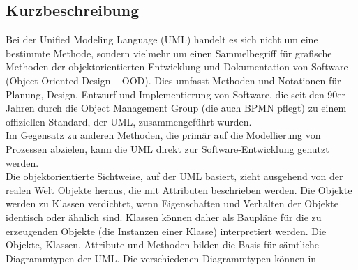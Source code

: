 \subsection{Kurzbeschreibung}
Bei der Unified Modeling Language (UML) handelt es sich nicht um eine bestimmte Methode, sondern vielmehr um einen Sammelbegriff für grafische Methoden der objektorientierten Entwicklung und Dokumentation von Software (Object Oriented Design – OOD). Dies umfasst Methoden und Notationen für Planung, Design, Entwurf und Implementierung von Software, die seit den 90er Jahren durch die Object Management Group (die auch BPMN pflegt) zu einem offiziellen Standard, der UML, zusammengeführt wurden.\\
Im Gegensatz zu anderen Methoden, die primär auf die Modellierung von Prozessen abzielen, kann die UML direkt zur Software-Entwicklung genutzt werden.\\
Die objektorientierte Sichtweise, auf der UML basiert, zieht ausgehend von der realen Welt Objekte heraus, die mit Attributen beschrieben werden. Die Objekte werden zu Klassen verdichtet, wenn Eigenschaften und Verhalten der Objekte identisch oder ähnlich sind. Klassen können daher als Baupläne für die zu erzeugenden Objekte (die Instanzen einer Klasse) interpretiert werden. Die Objekte, Klassen, Attribute und Methoden bilden die Basis für sämtliche Diagrammtypen der UML. Die verschiedenen Diagrammtypen können in\\


